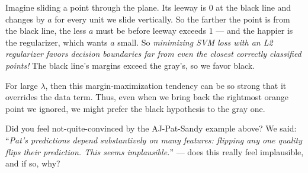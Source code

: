   Imagine sliding a point through the plane.  Its leeway is $0$ at the
  black line and changes by $a$ for every unit we slide vertically.
  So the farther the point is from the black line, the less $a$
  must be before leeway exceeds $1$ --- and the happier is
  the regularizer, which wants $a$ small.
  So \emph{minimizing SVM loss with an L2 regularizer favors decision
  boundaries far from even the closest correctly classified points!}  The black
  line's margins exceed the gray's, so we favor black.

  For large $\lambda$, then this margin-maximization tendency can be so
  strong that it overrides the data term.  Thus, even when we bring back
  the rightmost {\rng orange point} we ignored, we might prefer the black
  hypothesis to the gray one.


  \newpage
{}

  \begin{marginfigure}[-2cm]
    \centering
    \caption{%
      With $\lambda=0.02$ the objective visibly prefers weights near $0$.
      We develop an algorithm to take steps in this plane
      toward the minimum, `rolling down' the hill so to speak.
    }
  \end{marginfigure}



\newpage
{}\marginnote{\veryoptional}
  Did you feel not-quite-convinced by the AJ-Pat-Sandy example above?
  We said: ``\emph{Pat's predictions depend substantively on many
  features: flipping any one quality flips their prediction.  This seems
  implausible.}'' --- does this really feel implausible, and if so, why?
